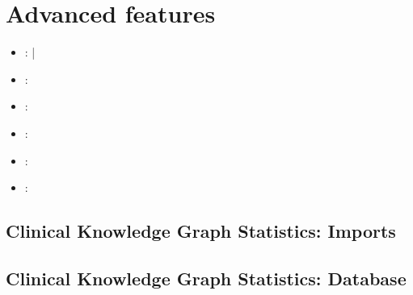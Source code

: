 \documentclass[letterpaper,10pt,english]{sphinxmanual}
\begin{document}
\chapter{Advanced features}
\label{\detokenize{index:advanced-features}}\begin{itemize}
\item {} 
:
{\hyperref[\detokenize{advanced_features/import-statistics::doc}]{}} |
{\hyperref[\detokenize{advanced_features/graphdb-statistics::doc}]{}}

\item {} 
:
{\hyperref[\detokenize{advanced_features/ckg-notebooks::doc}]{}}

\item {} 
:
{\hyperref[\detokenize{advanced_features/ckg-queries::doc}]{}}

\item {} 
:
{\hyperref[\detokenize{advanced_features/standard-analysis::doc}]{}}

\item {} 
:
{\hyperref[\detokenize{advanced_features/visualization-plots::doc}]{}}

\item {} 
:
{\hyperref[\detokenize{advanced_features/R-interface::doc}]{}}

\end{itemize}


\section{Clinical Knowledge Graph Statistics: Imports}
\label{\detokenize{advanced_features/import-statistics:clinical-knowledge-graph-statistics-imports}}\label{\detokenize{advanced_features/import-statistics::doc}}

\section{Clinical Knowledge Graph Statistics: Database}
\label{\detokenize{advanced_features/graphdb-statistics:clinical-knowledge-graph-statistics-database}}\label{\detokenize{advanced_features/graphdb-statistics::doc}}
\end{document}
